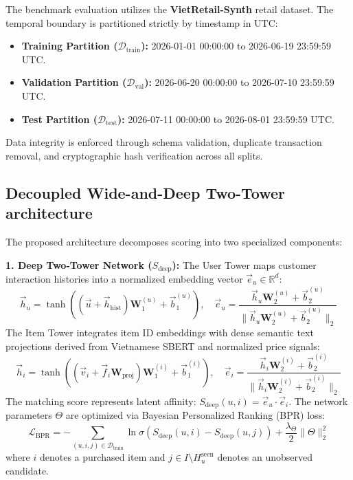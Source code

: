 \documentclass[10pt,a4paper]{article}
\begin{document}
The benchmark evaluation utilizes the \textbf{VietRetail-Synth} retail dataset. The temporal boundary is partitioned strictly by timestamp in UTC:
\begin{itemize}
    \item \textbf{Training Partition ($\mathcal{D}_{\mathrm{train}}$):} 2026-01-01 00:00:00 to 2026-06-19 23:59:59 UTC.
    \item \textbf{Validation Partition ($\mathcal{D}_{\mathrm{val}}$):} 2026-06-20 00:00:00 to 2026-07-10 23:59:59 UTC.
    \item \textbf{Test Partition ($\mathcal{D}_{\mathrm{test}}$):} 2026-07-11 00:00:00 to 2026-08-01 23:59:59 UTC.
\end{itemize}
Data integrity is enforced through schema validation, duplicate transaction removal, and cryptographic hash verification across all splits.

\subsection{Decoupled Wide-and-Deep Two-Tower architecture}

The proposed architecture decomposes scoring into two specialized components:

\textbf{1. Deep Two-Tower Network ($S_{\mathrm{deep}}$):} The User Tower maps customer interaction histories into a normalized embedding vector $\vec{e}_u \in \mathbb{R}^d$:
\begin{equation}
    \vec{h}_u = \tanh \left( (\vec{u} + \vec{h}_{\mathrm{hist}}) \mathbf{W}_1^{(u)} + \vec{b}_1^{(u)} \right), \quad \vec{e}_u = \frac{\vec{h}_u \mathbf{W}_2^{(u)} + \vec{b}_2^{(u)}}{\|\vec{h}_u \mathbf{W}_2^{(u)} + \vec{b}_2^{(u)}\|_2}
\end{equation}
The Item Tower integrates item ID embeddings with dense semantic text projections derived from Vietnamese SBERT and normalized price signals:
\begin{equation}
    \vec{h}_i = \tanh \left( (\vec{v}_i + \vec{f}_i \mathbf{W}_{\mathrm{proj}}) \mathbf{W}_1^{(i)} + \vec{b}_1^{(i)} \right), \quad \vec{e}_i = \frac{\vec{h}_i \mathbf{W}_2^{(i)} + \vec{b}_2^{(i)}}{\|\vec{h}_i \mathbf{W}_2^{(i)} + \vec{b}_2^{(i)}\|_2}
\end{equation}
The matching score represents latent affinity: $S_{\mathrm{deep}}(u, i) = \vec{e}_u \cdot \vec{e}_i$. The network parameters $\Theta$ are optimized via Bayesian Personalized Ranking (BPR) loss:
\begin{equation}
    \mathcal{L}_{\mathrm{BPR}} = - \sum_{(u, i, j) \in \mathcal{D}_{\mathrm{train}}} \ln \sigma \left( S_{\mathrm{deep}}(u, i) - S_{\mathrm{deep}}(u, j) \right) + \frac{\lambda_{\Theta}}{2} \|\Theta\|_2^2
\end{equation}
where $i$ denotes a purchased item and $j \in I \setminus H_u^{\mathrm{seen}}$ denotes an unobserved candidate.
\end{document}
